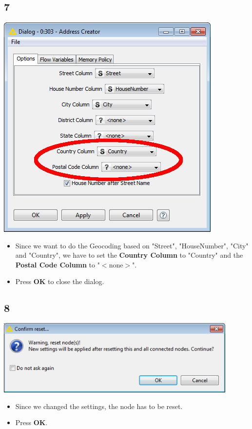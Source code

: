 \documentclass{beamer}
\begin{document}
\subsection{7}
\begin{frame}
	\begin{center}
  		\includegraphics[height=0.6\textheight]{7.png}
	\end{center}
	\begin{itemize}
		\item Since we want to do the Geocoding based on "Street", "HouseNumber", "City" and "Country", we have to set the \textbf{Country Column} to "Country" and the \textbf{Postal Code Column} to "$<$none$>$".
		\item Press \textbf{OK} to close the dialog.
	\end{itemize}
\end{frame}

\subsection{8}
\begin{frame}
	\begin{center}
  		\includegraphics[width=0.9\textwidth]{8.png}
	\end{center}
	\begin{itemize}
		\item Since we changed the settings, the node has to be reset.
		\item Press \textbf{OK}.
	\end{itemize}
\end{frame}
\end{document}

